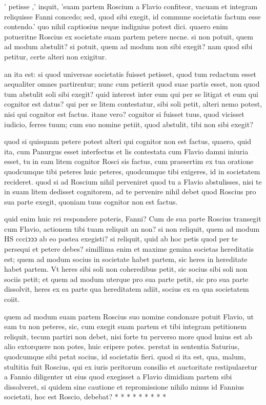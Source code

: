  ' petisse ,' inquit, 'suam partem Roscium a Flavio confiteor, vacuam et integram reliquisse Fanni concedo; sed, quod sibi exegit, id commune societatis factum esse contendo.' quo nihil captiosius neque indignius potest dici. quaero enim potueritne Roscius ex societate suam partem petere necne. si non potuit, quem ad modum abstulit? si potuit, quem ad modum non sibi exegit? nam quod sibi petitur, certe alteri non exigitur.

 an ita est: si quod universae societatis fuisset petisset, quod tum redactum esset aequaliter omnes partirentur; nunc cum petierit quod suae partis esset, non quod tum abstulit soli sibi exegit? quid interest inter eum qui per se litigat et eum qui cognitor est datus? qui per se litem contestatur, sibi soli petit, alteri nemo potest, nisi qui cognitor est factus. itane vero? cognitor si fuisset tuus, quod vicisset iudicio, ferres tuum; cum suo nomine petiit, quod abstulit, tibi non sibi exegit?

 quod si quisquam petere potest alteri qui cognitor non est factus, quaero, quid ita, cum Panurgus esset interfectus et lis contestata cum Flavio damni iniuria esset, tu in eam litem cognitor Rosci sis factus, cum praesertim ex tua oratione quodcumque tibi peteres huic peteres, quodcumque tibi exigeres, id in societatem recideret. quod si ad Roscium nihil perveniret quod tu a Flavio abstulisses, nisi te in suam litem dedisset cognitorem, ad te pervenire nihil debet quod Roscius pro sua parte exegit, quoniam tuus cognitor non est factus.

 quid enim huic rei respondere poteris, Fanni? Cum de sua parte Roscius transegit cum Flavio, actionem tibi tuam reliquit an non? si non reliquit, quem ad modum HS ccciↄↄↄ ab eo postea exegisti? si reliquit, quid ab hoc petis quod per te persequi et petere debes? simillima enim et maxime gemina societas hereditatis est; quem ad modum socius in societate habet partem, sic heres in hereditate habet partem. Vt heres sibi soli non coheredibus petit, sic socius sibi soli non sociis petit; et quem ad modum uterque pro sua parte petit, sic pro sua parte dissolvit, heres ex ea parte qua hereditatem adiit, socius ex ea qua societatem coiit.

 quem ad modum suam partem Roscius suo nomine condonare potuit Flavio, ut eam tu non peteres, sic, cum exegit suam partem et tibi integram petitionem reliquit, tecum partiri non debet, nisi forte tu perverso more quod huius est ab alio extorquere non potes, huic eripere potes. perstat in sententia Saturius, quodcumque sibi petat socius, id societatis fieri. quod si ita est, qua, malum, stultitia fuit Roscius, qui ex iuris peritorum consilio et auctoritate restipularetur a Fannio diligenter ut eius quod exegisset a Flavio dimidiam partem sibi dissolveret, si quidem sine cautione et repromissione nihilo minus id Fannius societati, hoc est Roscio, debebat? * * * * * * * * *
